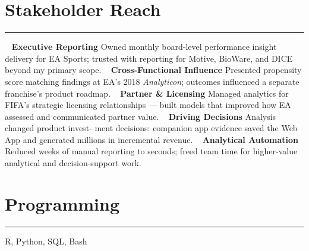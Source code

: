 %
%

\vspace{-1.0cm}
\section{\LARGE Stakeholder Reach}
\noindent\rule{\textwidth}{0.4pt}
\vspace{-0.2cm}
~
\textbf{\large Executive Reporting}
\faGem Owned monthly board-level performance insight delivery for EA Sports; trusted with reporting for Motive, BioWare, and DICE beyond my primary scope.
~
\textbf{\large Cross-Functional Influence}
\faGem Presented propensity score matching findings at EA's 2018 \textit{Analyticon}; outcomes influenced a separate franchise's product roadmap.
~
\textbf{\large Partner \& Licensing}
\faGem Managed analytics for FIFA's strategic licensing relationships — built models that improved how EA assessed and communicated partner value.
~
\textbf{\large Driving Decisions}
\faGem Analysis changed product invest- ment decisions: companion app evidence saved the Web App and generated millions in incremental revenue.
~
\textbf{\large Analytical Automation}
\faGem Reduced weeks of manual reporting to seconds; freed team time for higher-value analytical and decision-support work.
\section{\LARGE Programming}
\noindent\rule{\textwidth}{0.4pt}
R, Python, SQL, Bash
